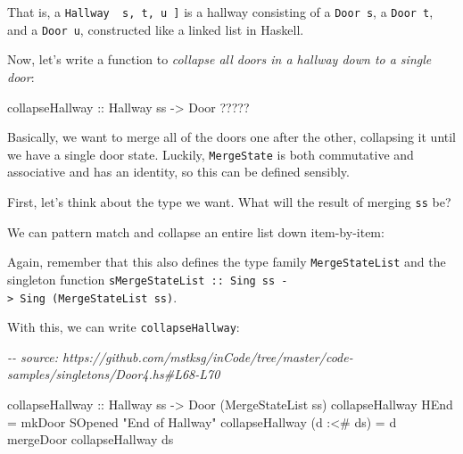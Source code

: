 \documentclass[]{article}
\newenvironment{Shaded}{}{}
\newcommand{\CommentTok}[1]{\textcolor[rgb]{0.38,0.63,0.69}{\textit{#1}}}
\newcommand{\DataTypeTok}[1]{\textcolor[rgb]{0.56,0.13,0.00}{#1}}
\newcommand{\NormalTok}[1]{#1}
\newcommand{\OperatorTok}[1]{\textcolor[rgb]{0.40,0.40,0.40}{#1}}
\newcommand{\OtherTok}[1]{\textcolor[rgb]{0.00,0.44,0.13}{#1}}
\newcommand{\StringTok}[1]{\textcolor[rgb]{0.25,0.44,0.63}{#1}}
\begin{document}
That is, a \texttt{Hallway\ \textquotesingle{}{[}\ s,\ t,\ u\ {]}} is a hallway
consisting of a \texttt{Door\ s}, a \texttt{Door\ t}, and a \texttt{Door\ u},
constructed like a linked list in Haskell.

Now, let's write a function to \emph{collapse all doors in a hallway down to a
single door}:

\begin{Shaded}
\begin{Highlighting}[]
\OtherTok{collapseHallway ::} \DataTypeTok{Hallway}\NormalTok{ ss }\OtherTok{{-}>} \DataTypeTok{Door} \OperatorTok{?????}
\end{Highlighting}
\end{Shaded}

Basically, we want to merge all of the doors one after the other, collapsing it
until we have a single door state. Luckily, \texttt{MergeState} is both
commutative and associative and has an identity, so this can be defined
sensibly.

First, let's think about the type we want. What will the result of merging
\texttt{ss} be?

We can pattern match and collapse an entire list down item-by-item:

\begin{Shaded}
\end{Shaded}

Again, remember that this also defines the type family \texttt{MergeStateList}
and the singleton function
\texttt{sMergeStateList\ ::\ Sing\ ss\ -\textgreater{}\ Sing\ (MergeStateList\ ss)}.

With this, we can write \texttt{collapseHallway}:

\begin{Shaded}
\begin{Highlighting}[]
\CommentTok{{-}{-} source: https://github.com/mstksg/inCode/tree/master/code{-}samples/singletons/Door4.hs\#L68{-}L70}

\OtherTok{collapseHallway ::} \DataTypeTok{Hallway}\NormalTok{ ss }\OtherTok{{-}>} \DataTypeTok{Door}\NormalTok{ (}\DataTypeTok{MergeStateList}\NormalTok{ ss)}
\NormalTok{collapseHallway }\DataTypeTok{HEnd}       \OtherTok{=}\NormalTok{ mkDoor }\DataTypeTok{SOpened} \StringTok{"End of Hallway"}
\NormalTok{collapseHallway (d }\OperatorTok{:<\#}\NormalTok{ ds) }\OtherTok{=}\NormalTok{ d }\OtherTok{\textasciigrave{}mergeDoor\textasciigrave{}}\NormalTok{ collapseHallway ds}
\end{Highlighting}
\end{Shaded}
\end{document}
